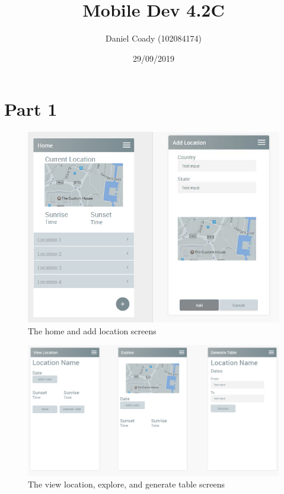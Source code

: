 \documentclass{scrartcl}
\title{Mobile Dev 4.2C}
\author{Daniel Coady (102084174)}
\date{29/09/2019}
\begin{document}
\maketitle

\section*{Part 1}
\begin{figure}[h]
    \centering
    \includegraphics[scale=0.8]{images/screen1.png}
    \caption{The home and add location screens}
\end{figure}

\pagebreak

\begin{figure}[h]
    \centering
    \includegraphics[scale=0.55]{images/screen2.png}
    \caption{The view location, explore, and generate table screens}
\end{figure}
\end{document}
